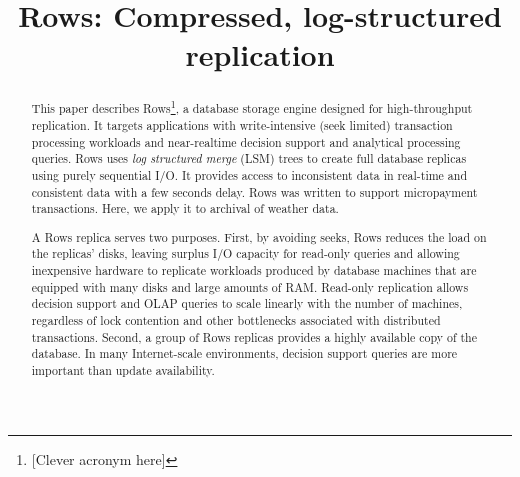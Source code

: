 \documentclass{sig-alternate-sigmod08}
\newcommand{\rows}{Rows\xspace}
\begin{document}
%

\title{{\ttlit \rows}: Compressed, log-structured replication}
%
%
\author{}
\maketitle
\begin{abstract}
This paper describes \rows\footnote{[Clever acronym here]}, a database
storage engine designed for high-throughput replication.  It targets
applications with write-intensive (seek limited) transaction
processing workloads and near-realtime decision support and analytical
processing queries.  \rows uses {\em log structured merge} (LSM) trees
to create full database replicas using purely sequential I/O.  It
provides access to inconsistent data in real-time and consistent data
with a few seconds delay.  \rows was written to support micropayment
transactions.  Here, we apply it to archival of weather data.

A \rows replica serves two purposes.  First, by avoiding seeks, \rows
reduces the load on the replicas' disks, leaving surplus I/O capacity
for read-only queries and allowing inexpensive hardware to replicate
workloads produced by database machines that are equipped with many
disks and large amounts of RAM.  Read-only replication allows decision
support and OLAP queries to scale linearly with the number of
machines, regardless of lock contention and other bottlenecks
associated with distributed transactions.  Second, a group of \rows
replicas provides a highly available copy of the database.  In many
Internet-scale environments, decision support queries are more
important than update availability.



\end{abstract}
\end{document}
